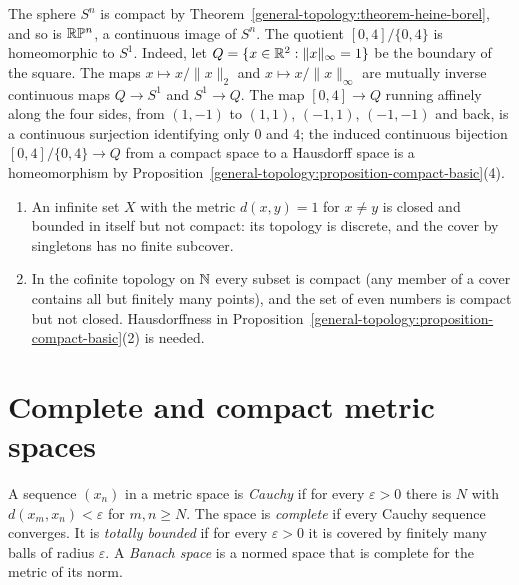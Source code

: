 \begin{example}\label{general-topology:example-circle}
The sphere $S^n$ is compact by Theorem~\ref{general-topology:theorem-heine-borel}, and so is $\mathbb{R}\mathbb{P}^n$, a continuous image of $S^n$. The quotient
$[0, 4]/\{0, 4\}$ is homeomorphic to $S^1$. Indeed, let $Q = \{x \in \mathbb{R}^2 : \|x\|_\infty = 1\}$ be the boundary of the square. The maps
$x \mapsto x/\|x\|_2$ and $x \mapsto x/\|x\|_\infty$ are mutually inverse continuous maps $Q \to S^1$ and $S^1 \to Q$. The map $[0, 4] \to Q$ running
affinely along the four sides, from $(1, -1)$ to $(1, 1)$, $(-1, 1)$, $(-1, -1)$ and back, is a continuous surjection identifying only $0$ and $4$; the
induced continuous bijection $[0, 4]/\{0, 4\} \to Q$ from a compact space to a Hausdorff space is a homeomorphism by
Proposition~\ref{general-topology:proposition-compact-basic}(4).
\end{example}

\begin{counterexample}\label{general-topology:counterexample-compactness}
\begin{enumerate}
\item An infinite set $X$ with the metric $d(x, y) = 1$ for $x \neq y$ is closed and bounded in itself but not compact: its topology is discrete, and the
cover by singletons has no finite subcover.
\item In the cofinite topology on $\mathbb{N}$ every subset is compact (any member of a cover contains all but finitely many points), and the set of even
numbers is compact but not closed. Hausdorffness in Proposition~\ref{general-topology:proposition-compact-basic}(2) is needed.
\end{enumerate}
\end{counterexample}

\section{Complete and compact metric spaces}\label{general-topology:section-complete}

\begin{definition}\label{general-topology:definition-complete}
A sequence $(x_n)$ in a metric space is \emph{Cauchy} if for every $\varepsilon > 0$ there is $N$ with $d(x_m, x_n) < \varepsilon$ for $m, n \geq N$.
The space is \emph{complete} if every Cauchy sequence converges. It is \emph{totally bounded} if for every $\varepsilon > 0$ it is covered by finitely
many balls of radius $\varepsilon$. A \emph{Banach space} is a normed space that is complete for the metric of its norm.
\end{definition}

